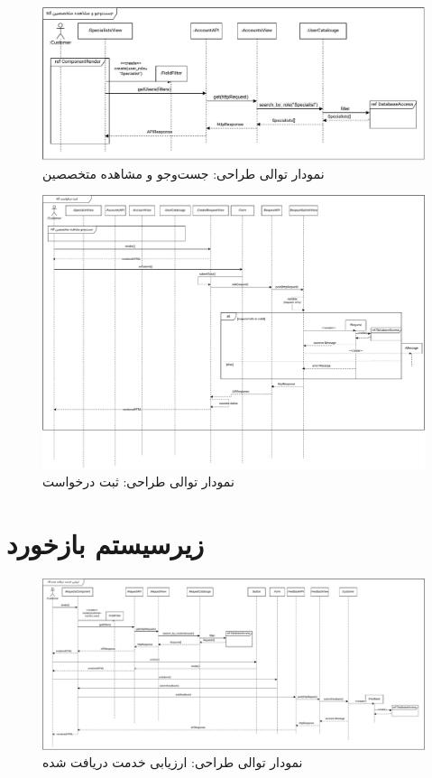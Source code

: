 \begin{figure}[ht!]
	\centering
	\includegraphics[scale=0.8]{figs/design-sequence/3-17.pdf}
	\caption{نمودار توالی طراحی: جست‌وجو و مشاهده متخصصین}
\end{figure}
\FloatBarrier
\newpage

\eject \pdfpagewidth=15in \pdfpageheight=12in

\begin{figure}[ht!]
	\centering
	\includegraphics[scale=0.8]{figs/design-sequence/3-18.pdf}
	\caption{نمودار توالی طراحی: ثبت درخواست}
\end{figure}
\FloatBarrier
\newpage



\section{زیرسیستم بازخورد}

\eject \pdfpagewidth=17in \pdfpageheight=8in

\begin{figure}[ht!]
	\centering
	\includegraphics[scale=0.8]{figs/design-sequence/3-24.pdf}
	\caption{نمودار توالی طراحی: ارزیابی خدمت دریافت شده}
\end{figure}
\FloatBarrier
\newpage

